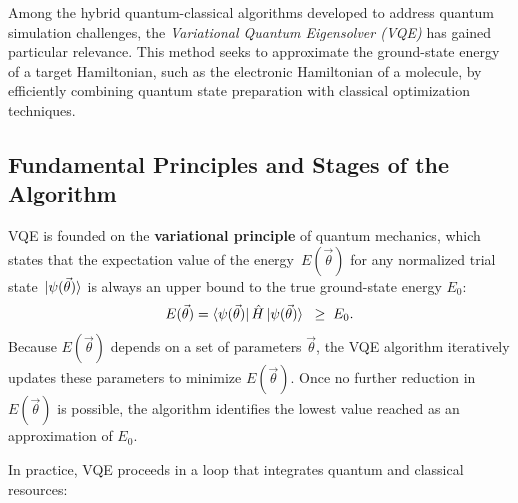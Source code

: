 Among the hybrid quantum-classical algorithms developed to address quantum simulation challenges, the \emph{Variational Quantum Eigensolver (VQE)} has gained particular relevance. This method seeks to approximate the ground-state energy of a target Hamiltonian, such as the electronic Hamiltonian of a molecule, by efficiently combining quantum state preparation with classical optimization techniques.

\subsection{Fundamental Principles and Stages of the Algorithm}
\label{subsec:vqe_principles_stages}

VQE is founded on the \textbf{variational principle} of quantum mechanics, which states that the expectation value of the energy 
\(\,E(\vec{\theta})\)
for any normalized trial state \(\,\ket{\psi(\vec{\theta})}\) is always an upper bound to the true ground-state energy \(E_0\):
\[
E(\vec{\theta}) 
= \bra{\psi(\vec{\theta})} \hat{H} \ket{\psi(\vec{\theta})}
\;\;\geq\; E_0.
\]
Because \(E(\vec{\theta})\) depends on a set of parameters \(\vec{\theta}\), the VQE algorithm iteratively updates these parameters to minimize \(E(\vec{\theta})\). Once no further reduction in \(E(\vec{\theta})\) is possible, the algorithm identifies the lowest value reached as an approximation of \(E_0\).

In practice, VQE proceeds in a loop that integrates quantum and classical resources:

